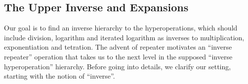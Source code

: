 






\subsection{The Upper Inverse and Expansions}

Our goal is to find an inverse hierarchy to the hyperoperations, which should include division, logarithm and iterated logarithm as inverses to multiplication, exponentiation and tetration. The advent of repeater motivates an ``inverse repeater'' operation that takes us to the next level in the supposed ``inverse hyperoperation'' hierarchy. Before going into details, we clarify our setting, starting with the notion of ``inverse''.

